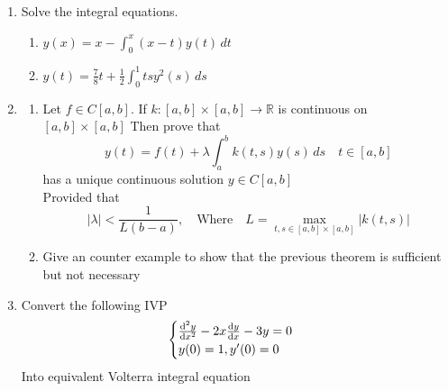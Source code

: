 \documentclass[11pt,a4paper]{article}
\begin{document}
\begin{enumerate}

    \item Solve the integral equations.
          \begin{enumerate}
              \item
                    $y(x)=x-\int_0^x (x-t) y(t) \,dt $
              \item  $y(t)=\frac{7}{8}t+\frac{1}{2} \int_0^1 ts y^2(s) \,ds$
          \end{enumerate}
    \item

          \begin{enumerate}
              \item Let $f \in C[a,b]$. If $k:[a,b]\times[a,b] \rightarrow \mathbb{R}$ is continuous on $[a,b]\times[a,b]$ Then prove that
                    $$y(t) = f(t) + \lambda \int_a^b k(t,s) y(s) \,ds \quad t\in[a,b]$$
                    has a unique continuous solution $y\in C[a,b]$\\
                    Provided that \\
                    $$|\lambda|< \frac{1}{L(b-a)} ,\quad \text{Where}\quad L= \max\limits_{t,s\in [a,b]\times[a,b]} |k(t,s)| $$
              \item Give an counter example to show that the previous theorem is sufficient but not necessary
          \end{enumerate}

    \item Convert the following IVP\\
          $$\begin{cases}
                  \dv[2]{y}{x} -2x \dv{y}{x} -3y =0 \\
                  y(0) =1 , y'(0)=0                 \\
              \end{cases}$$
          Into equivalent Volterra integral equation
\end{enumerate}
\newpage
\end{document}
